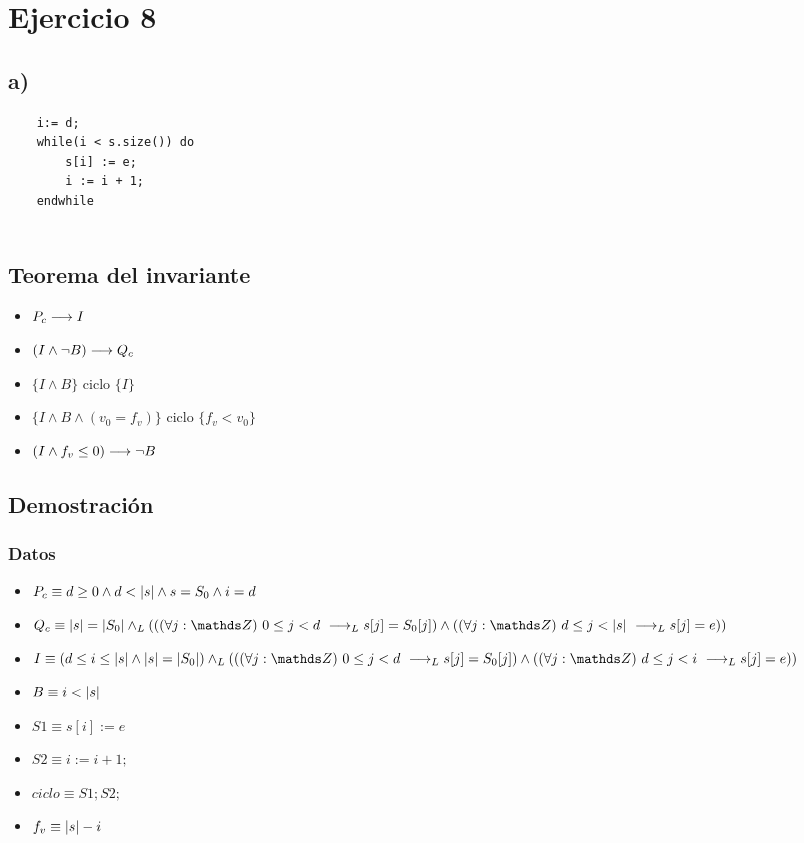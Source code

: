 \documentclass{article}
\begin{document}
\section*{Ejercicio 8}

\subsection*{a)}

\begin{verbatim}
    i:= d;
    while(i < s.size()) do
        s[i] := e;
        i := i + 1;
    endwhile
    
\end{verbatim}
\subsection*{Teorema del invariante}
\begin{itemize}
    \item $P_{c} \longrightarrow I$
    \item $(I \wedge \neg B) \longrightarrow Q_{c}$
    \item $\{I \wedge B\}$ ciclo $\{ I \}$
    \item $\{I \wedge B \wedge (v_{0} = f_{v})\}$ ciclo $\{f_{v} < v_{0}\}$
    \item $(I \wedge f_{v} \leq 0) \longrightarrow \neg B$
\end{itemize}

\subsection*{Demostración}
\subsubsection*{Datos}
\begin{itemize}
    \item $P_{c}    \equiv d \geq 0 \wedge d < |s| \wedge s = S_{0} \wedge i = d$
    \item $Q_{c}    \equiv \longitud{s} = \longitud{S_{0}} \yLuego ((\paraTodo{j}{0}{d}\implicaLuego s[j] = S_{0}[j]) \wedge (\paraTodo{j}{d}{\longitud{s}}\implicaLuego s[j] = e ))$
    \item $I        \equiv (d \leq i \leq \longitud{s} \wedge \longitud{s} = \longitud{S_{0}}) \yLuego ((\paraTodo{j}{0}{d}\implicaLuego s[j] = S_{0}[j]) \wedge (\paraTodo{j}{d}{i}\implicaLuego s[j] = e ))$
    \item $B        \equiv i < |s|$
    \item $S1       \equiv s[i] := e$
    \item $S2       \equiv i:= i + 1;$
    \item $ciclo    \equiv S1;S2;$
    \item $f_{v}    \equiv |s|-i$
\end{itemize}
\end{document}
